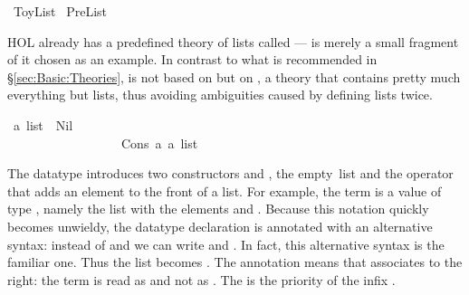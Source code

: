 %
\begin{isabellebody}%
\def\isabellecontext{ToyList}%
%
\isadelimtheory
%
\endisadelimtheory
%
\isatagtheory
{}\isamarkupfalse%
\ ToyList\isanewline
{}\ PreList\isanewline
{}%
\endisatagtheory
{\isafoldtheory}%
%
\isadelimtheory
%
\endisadelimtheory
%
\begin{isamarkuptext}%
\noindent
HOL already has a predefined theory of lists called  ---
 is merely a small fragment of it chosen as an example. In
contrast to what is recommended in \S\ref{sec:Basic:Theories},
 is not based on  but on , a
theory that contains pretty much everything but lists, thus avoiding
ambiguities caused by defining lists twice.%
\end{isamarkuptext}%
\isamarkuptrue%
\isamarkupfalse%
\ {\isacharprime}a\ list\ {\isacharequal}\ Nil\ \ \ \ \ \ \ \ \ \ \ \ \ \ \ \ \ \ \ \ \ \ \ \ \ \ {\isacharparenleft}{\isachardoublequoteopen}{\isacharbrackleft}{\isacharbrackright}{\isachardoublequoteclose}{\isacharparenright}\isanewline
\ \ \ \ \ \ \ \ \ \ \ \ \ \ \ \ \ {\isacharbar}\ Cons\ {\isacharprime}a\ {\isachardoublequoteopen}{\isacharprime}a\ list{\isachardoublequoteclose}\ \ \ \ \ \ \ \ \ \ \ \ {\isacharparenleft}\ {\isachardoublequoteopen}{\isacharhash}{\isachardoublequoteclose}\ {}{}{\isacharparenright}%
\begin{isamarkuptext}%
\noindent
The datatype
 introduces two
constructors  and , the
empty~list and the operator that adds an element to the front of a list. For
example, the term  is a value of
type , namely the list with the elements  and
. Because this notation quickly becomes unwieldy, the
datatype declaration is annotated with an alternative syntax: instead of
 and  we can write
\isa{{\isacharbrackleft}{\isacharbrackright}} and
. In fact, this
alternative syntax is the familiar one.  Thus the list  becomes . The annotation
means that \isa{{\isacharhash}} associates to
the right: the term  is read as 
and not as .
The  is the priority of the infix \isa{{\isacharhash}}.


\end{isamarkuptext}
\end{isabellebody}
